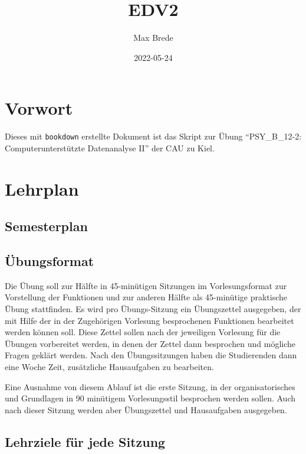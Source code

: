 \documentclass[
]{book}
\title{EDV2}
\author{Max Brede}
\date{2022-05-24}
\begin{document}
\maketitle

{
\setcounter{tocdepth}{1}
\tableofcontents
}
\hypertarget{vorwort}{%
\chapter{Vorwort}\label{vorwort}}

Dieses mit \texttt{bookdown} erstellte Dokument ist das Skript zur Übung ``PSY\_B\_12-2: Computerunterstützte Datenanalyse II'' der CAU zu Kiel.

\hypertarget{lehrplan}{%
\chapter{Lehrplan}\label{lehrplan}}

\hypertarget{semesterplan}{%
\section{Semesterplan}\label{semesterplan}}

\hypertarget{uxfcbungsformat}{%
\section{Übungsformat}\label{uxfcbungsformat}}

Die Übung soll zur Hälfte in 45-minütigen Sitzungen im Vorlesungsformat zur Vorstellung der Funktionen und zur anderen Hälfte als 45-minütige praktische Übung stattfinden.
Es wird pro Übungs-Sitzung ein Übungszettel ausgegeben, der mit Hilfe der in der Zugehörigen Vorlesung besprochenen Funktionen bearbeitet werden können soll.
Diese Zettel sollen nach der jeweiligen Vorlesung für die Übungen vorbereitet werden, in denen der Zettel dann besprochen und mögliche Fragen geklärt werden.
Nach den Übungssitzungen haben die Studierenden dann eine Woche Zeit, zusätzliche Hausaufgaben zu bearbeiten.

Eine Ausnahme von diesem Ablauf ist die erste Sitzung, in der organisatorisches und Grundlagen in 90 minütigem Vorlesungsstil besprochen werden sollen. Auch nach dieser Sitzung werden aber Übungszettel und Hausaufgaben ausgegeben.

\hypertarget{lehrziele-fuxfcr-jede-sitzung}{%
\section{Lehrziele für jede Sitzung}\label{lehrziele-fuxfcr-jede-sitzung}}
\end{document}

